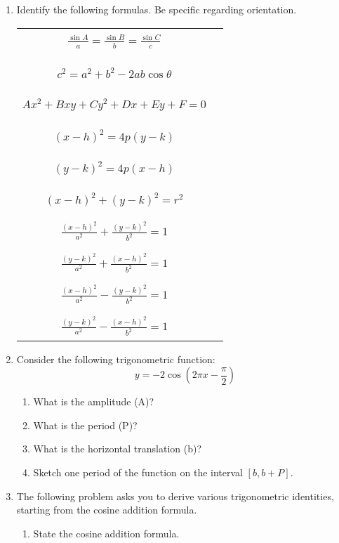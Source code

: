\documentclass[letterpaper,12pt,fleqn]{article}
\newcommand{\fillin}{\rule{3in}{1pt}}
\begin{document}
\begin{enumerate}
\item Identify the following formulas. Be specific regarding orientation.
  
  \begin{tabular}{cc}
    \\
    $\frac{\sin{A}}{a}=\frac{\sin{B}}{b}=\frac{\sin{C}}{c}$ & \fillin \\
    \\
    $c^2=a^2+b^2-2ab\cos\theta$ & \fillin \\
    \\
    $Ax^2+Bxy+Cy^2+Dx+Ey+F=0$ & \fillin \\
    \\
    $(x-h)^2=4p(y-k)$ & \fillin \\
    \\
    $(y-k)^2=4p(x-h)$ & \fillin \\
    \\
    $(x-h)^2+(y-k)^2=r^2$ & \fillin \\
    \\
    $\frac{(x-h)^2}{a^2}+\frac{(y-k)^2}{b^2}=1$ & \fillin \\
    \\
    $\frac{(y-k)^2}{a^2}+\frac{(x-h)^2}{b^2}=1$ & \fillin \\
    \\
    $\frac{(x-h)^2}{a^2}-\frac{(y-k)^2}{b^2}=1$ & \fillin \\
    \\
    $\frac{(y-k)^2}{a^2}-\frac{(x-h)^2}{b^2}=1$ & \fillin \\
  \end{tabular}
\newpage
\item Consider the following trigonometric function:
  \[y=-2\cos(2\pi x-\frac{\pi}{2})\]
  \begin{enumerate}
  \item What is the amplitude (A)?

    \vspace{1in}
    
  \item What is the period (P)?

    \vspace{1in}
    
  \item What is the horizontal translation (b)?

    \vspace{1in}
    
  \item Sketch one period of the function on the interval $[b,b+P]$.
  \end{enumerate}
\newpage
\item The following problem asks you to derive various trigonometric
  identities, starting from the cosine addition formula.
  \begin{enumerate}
  \item State the cosine addition formula.


\end{enumerate}
\end{enumerate}
\end{document}

